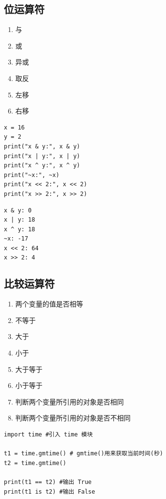 \subsection{位运算符}
\begin{enumerate}[label=\arabic*)]
    \item \codeinline{\&} 与
    \item \codeinline{|} 或
    \item \codeinline{\textasciicircum{}} 异或
    \item \codeinline{\textasciitilde{}} 取反
    \item \codeinline{<<} 左移
    \item \codeinline{>>} 右移
\end{enumerate}
\begin{lstlisting}[style=pythonstyle]
x = 16
y = 2
print("x & y:", x & y)
print("x | y:", x | y)
print("x ^ y:", x ^ y)
print("~x:", ~x)
print("x << 2:", x << 2)
print("x >> 2:", x >> 2)
\end{lstlisting}    
\begin{lstlisting}[style=demostyle,numbers=none]  
x & y: 0
x | y: 18
x ^ y: 18
~x: -17
x << 2: 64
x >> 2: 4    
\end{lstlisting}    

\subsection{比较运算符}
\begin{enumerate}[label=\arabic*)]
    \item \codeinline{==} 两个变量的值是否相等
    \item \codeinline{!=} 不等于
    \item \codeinline{>} 大于
    \item \codeinline{<} 小于
    \item \codeinline{>=} 大于等于
    \item \codeinline{<=} 小于等于
    \item {} 判断两个变量所引用的对象是否相同
    \item {} 判断两个变量所引用的对象是否不相同
\end{enumerate}

\begin{lstlisting}[style=pythonstyle]
import time #引入 time 模块

t1 = time.gmtime() # gmtime()用来获取当前时间(秒)
t2 = time.gmtime()

print(t1 == t2) #输出 True
print(t1 is t2) #输出 False
\end{lstlisting}

